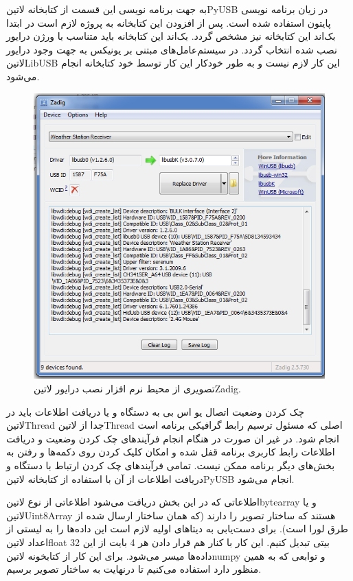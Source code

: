 به جهت برنامه نویسی این قسمت از کتابخانه ‌لاتین{PyUSB} در زیان برنامه نویسی پایتون استفاده شده است. پس از افزودن این کتابخانه به پروژه لازم است در ابتدا بک‌اند این کتابخانه نیز مشخص گردد. بک‌اند این کتابخانه باید متناسب با ورژن درایور نصب شده انتخاب گردد. در سیستم‌عامل‌های مبتنی بر یونیکس به جهت وجود درایور ‌لاتین{LibUSB} این کار لازم نیست و به طور خودکار این کار توسط خود کتابخانه انجام می‌شود. 

\begin{figure}[!t]
	\centering
	\includegraphics[width=0.7\linewidth]{Assets/usbDriver.png}
	\caption{تصویری از محیط نرم افزار نصب درایور ‌لاتین{Zadig}.}
	\label{fig:usbDriver}
\end{figure}

چک کردن وضعیت اتصال یو اس بی به دستگاه و یا دریافت اطلاعات باید در ‌لاتین{Thread} جدا از ‌لاتین{Thread} اصلی که مسئول ترسیم رابط گرافیکی برنامه است انجام شود. در غیر ان صورت در هنگام انجام فرآیند‌های چک کردن وضعیت و دریافت اطلاعات رابط کاربری برنامه قفل شده و امکان کلیک کردن روی دکمه‌ها و رفتن به بخش‌های دیگر برنامه ممکن نیست. تمامی فرآیند‌های چک کردن ارتباط با دستگاه و دریافت اطلاعات از آن با استفاده از کتابخانه ‌لاتین{PyUSB} انجام می‌شود.

اطلاعاتی که در این بخش دریافت می‌شود اطلاعاتی از نوع ‌لاتین{bytearray} و یا ‌لاتین{Uint8Array} هستند که ساختار تصویر  را دارند (که همان ساختار ارسال شده از طرق لورا است). برای دست‌یابی به دیتا‌های اولیه لازم است این داده‌ها را به لیستی از اعداد ‌لاتین{float} 32 بیتی تبدیل کنیم. این کار با کنار هم قرار دادن هر 4 بایت از این داده‌ها میسر می‌شود. برای این کار از کتابخونه ‌لاتین{numpy} و توابعی که به همین منظور دارد استفاده می‌کنیم تا درنهایت به ساختار تصویر  برسیم.  

